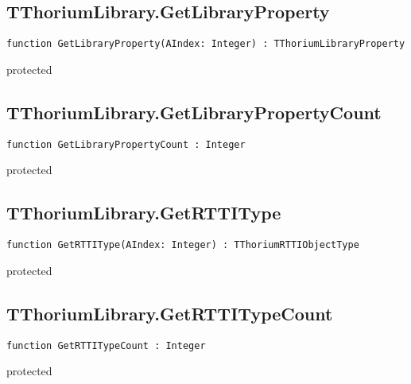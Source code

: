 \subsection{TThoriumLibrary.GetLibraryProperty}
\label{thoriumcore:thorium:tthoriumlibrary:getlibraryproperty}
\begin{FPCList}
\Synopsis
\Declaration 

\begin{verbatim}
function GetLibraryProperty(AIndex: Integer) : TThoriumLibraryProperty
\end{verbatim}
\Visibility
protected
\Description
\Errors
\end{FPCList}
\subsection{TThoriumLibrary.GetLibraryPropertyCount}
\label{thoriumcore:thorium:tthoriumlibrary:getlibrarypropertycount}
\begin{FPCList}
\Synopsis
\Declaration 

\begin{verbatim}
function GetLibraryPropertyCount : Integer
\end{verbatim}
\Visibility
protected
\Description
\Errors
\end{FPCList}
\subsection{TThoriumLibrary.GetRTTIType}
\label{thoriumcore:thorium:tthoriumlibrary:getrttitype}
\begin{FPCList}
\Synopsis
\Declaration 

\begin{verbatim}
function GetRTTIType(AIndex: Integer) : TThoriumRTTIObjectType
\end{verbatim}
\Visibility
protected
\Description
\Errors
\end{FPCList}
\subsection{TThoriumLibrary.GetRTTITypeCount}
\label{thoriumcore:thorium:tthoriumlibrary:getrttitypecount}
\begin{FPCList}
\Synopsis
\Declaration 

\begin{verbatim}
function GetRTTITypeCount : Integer
\end{verbatim}
\Visibility
protected
\Description
\Errors
\end{FPCList}
